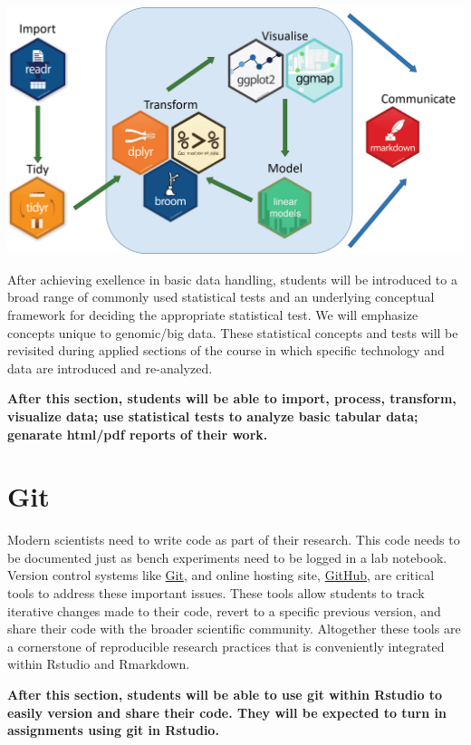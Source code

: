 \documentclass[]{book}
\begin{document}
\begin{center}\includegraphics[width=28in]{classes/images/tidyverse-packages} \end{center}

After achieving exellence in basic data handling, students will be introduced to a broad range of commonly used statistical tests and an underlying conceptual framework for deciding the appropriate statistical test. We will emphasize concepts unique to genomic/big data. These statistical concepts and tests will be revisited during applied sections of the course in which specific technology and data are introduced and re-analyzed.

\textbf{After this section, students will be able to import, process, transform, visualize data; use statistical tests to analyze basic tabular data; genarate html/pdf reports of their work.}

\hypertarget{git}{%
\section{Git}\label{git}}

Modern scientists need to write code as part of their research. This code needs to be documented just as bench experiments need to be logged in a lab notebook. Version control systems like \href{https://git-scm.com}{Git}, and online
hosting site, \href{https://github.com}{GitHub}, are critical tools to address these important issues. These tools allow students to track iterative changes made to their code, revert to a specific previous version, and share their code with the broader scientific community. Altogether these tools are a cornerstone of reproducible research practices that is conveniently integrated within Rstudio and Rmarkdown.

\textbf{After this section, students will be able to use git within Rstudio to easily version and share their code. They will be expected to turn in assignments using git in Rstudio.}
\end{document}
